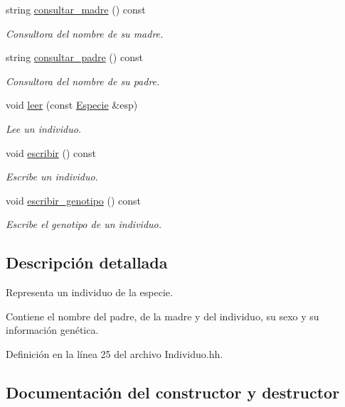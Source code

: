 \begin{DoxyCompactItemize}
string \hyperlink{class_individuo_a33f3985445a0e56e09b6bc405c6518f7}{consultar\+\_\+madre} () const
\begin{DoxyCompactList}\small\item\em Consultora del nombre de su madre. \end{DoxyCompactList}\item 
string \hyperlink{class_individuo_aa31ffa85aa6631315fc08dee6ef1845a}{consultar\+\_\+padre} () const
\begin{DoxyCompactList}\small\item\em Consultora del nombre de su padre. \end{DoxyCompactList}\item 
void \hyperlink{class_individuo_aca2828dea808d8a09b6bc22719dca574}{leer} (const \hyperlink{class_especie}{Especie} \&esp)
\begin{DoxyCompactList}\small\item\em Lee un individuo. \end{DoxyCompactList}\item 
void \hyperlink{class_individuo_afa626864f948a749bfb3ca277c316105}{escribir} () const
\begin{DoxyCompactList}\small\item\em Escribe un individuo. \end{DoxyCompactList}\item 
void \hyperlink{class_individuo_a709b63adb89ff41fec3f2a59cbb560a2}{escribir\+\_\+genotipo} () const
\begin{DoxyCompactList}\small\item\em Escribe el genotipo de un individuo. \end{DoxyCompactList}\end{DoxyCompactItemize}


\subsection{Descripción detallada}
Representa un individuo de la especie. 

Contiene el nombre del padre, de la madre y del individuo, su sexo y su información genética. 

Definición en la línea 25 del archivo Individuo.\+hh.



\subsection{Documentación del constructor y destructor}
\mbox{\label{class_individuo_a3042a660b9789ee24dd3658248c8e0b9}} 
